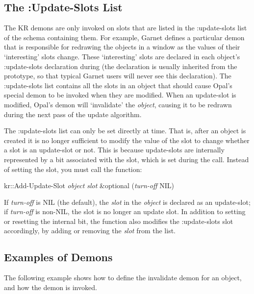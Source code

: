 \subsection{The :Update-Slots List}
\label{update-slots}

The KR demons are only invoked on slots that are listed in the
{\sc :update-slots} list of the schema containing them.  For example,
Garnet defines a particular demon that is responsible for redrawing the
objects in a window as the values of their `interesting' slots change.
These `interesting' slots are declared in each object's {\sc :update-slots}
declaration during  (the declaration is usually inherited
from the prototype, so that typical Garnet users will never see this
declaration).  The {\sc :update-slots} list contains all the slots in an object
that should cause Opal's special demon to be invoked when they are modified.
When an update-slot is modified, Opal's demon will `invalidate'
the {\it object}, causing it to be redrawn during the next pass of the update
algorithm.

The {\sc :update-slots} list can only be set directly at 
time.  That is, after an object is created it is no longer sufficient to
modify the value of the  slot to change whether a slot is an
update-slot or not.  This is because update-slots are internally represented
by a bit associated with the slot, which is set during the 
call.  Instead of setting the  slot, you must call the
function:

\begin{example}
kr::Add-Update-Slot {\it object slot} \&optional ({\it turn-off} NIL)  \value{function}
\end{example}

If {\it turn-off} is NIL (the default), the {\it slot} in the {\it object}
is declared as an update-slot; if {\it turn-off} is non-NIL, the slot is
no longer an update slot.  In addition to setting or resetting the
internal bit, the function also modifies the {\sc :update-slots} slot
accordingly, by adding or removing the {\it slot} from the list.



\subsection{Examples of Demons}


The following example shows how to define the invalidate demon for an
object, and how the demon is invoked.


